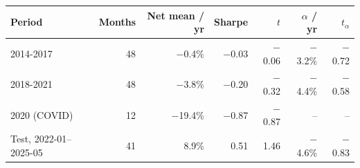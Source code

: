 \begin{tabular}{lrrrrrr}
\toprule
Period & Months & Net mean / yr & Sharpe & $t$ & $\alpha$ / yr & $t_\alpha$ \\
\midrule
2014-2017 & 48 & \ensuremath{-}0.4\% & \ensuremath{-}0.03 & \ensuremath{-}0.06 & \ensuremath{-}3.2\% & \ensuremath{-}0.72 \\
2018-2021 & 48 & \ensuremath{-}3.8\% & \ensuremath{-}0.20 & \ensuremath{-}0.32 & \ensuremath{-}4.4\% & \ensuremath{-}0.58 \\
2020 (COVID) & 12 & \ensuremath{-}19.4\% & \ensuremath{-}0.87 & \ensuremath{-}0.87 & -- & -- \\
Test, 2022-01--2025-05 & 41 & 8.9\% & 0.51 & 1.46 & \ensuremath{-}4.6\% & \ensuremath{-}0.83 \\
\bottomrule
\end{tabular}
